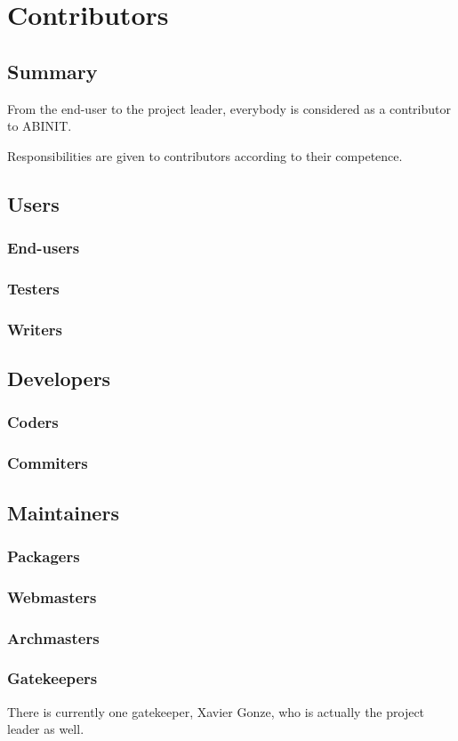 \chapter{Contributors}

\section{Summary}

From the end-user to the project leader, everybody is considered as a
contributor to ABINIT.

Responsibilities are given to contributors according to their competence.

\section{Users}

\subsection{End-users}

\subsection{Testers}

\subsection{Writers}

\section{Developers}

\subsection{Coders}

\subsection{Commiters}

\section{Maintainers}

\subsection{Packagers}

\subsection{Webmasters}

\subsection{Archmasters}

\subsection{Gatekeepers}

There is currently one gatekeeper, Xavier Gonze, who is actually the project
leader as well.
